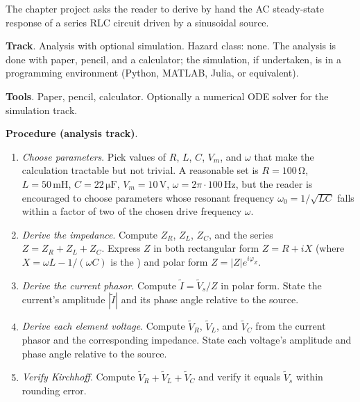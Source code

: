 \begin{project}
The chapter project
asks the reader to derive by hand the AC
steady-state response of a series RLC circuit driven by a
sinusoidal source.

\textbf{Track}. Analysis with optional simulation. Hazard class:
none. The analysis is done with paper, pencil, and a calculator;
the simulation, if undertaken, is in a programming environment
(Python, MATLAB, Julia, or equivalent).

\textbf{Tools}. Paper, pencil, calculator. Optionally a numerical
ODE solver for the simulation track.

\textbf{Procedure (analysis track)}.

\begin{enumerate}[leftmargin=*]
  \item \emph{Choose parameters}. Pick values of $R$, $L$, $C$,
    $V_{m}$, and $\omega$ that make the calculation tractable but
    not trivial. A reasonable set is $R = 100 \,\si{\ohm}$, $L =
    50 \,\si{\milli\henry}$, $C = 22 \,\si{\micro\farad}$,
    $V_{m} = 10 \,\si{\volt}$, $\omega = 2\pi \cdot 100 \,\si
    {\hertz}$, but the reader is encouraged to choose
    parameters whose resonant frequency $\omega_{0} = 1/\sqrt{LC}$
    falls within a factor of two of the chosen drive frequency
    $\omega$.

  \item \emph{Derive the impedance}. Compute $Z_{R}$, $Z_{L}$,
    $Z_{C}$, and the series $Z = Z_{R} + Z_{L} + Z_{C}$. Express
    $Z$ in both rectangular form $Z = R + iX$ (where $X = \omega
    L - 1/(\omega C)$ is the ) and polar form
    $Z = |Z| e^{i\varphi_{Z}}$.

  \item \emph{Derive the current phasor}. Compute $\tilde{I} =
    \tilde{V}_{s}/Z$ in polar form. State the current's amplitude
    $|\tilde{I}|$ and its phase angle relative to the source.

  \item \emph{Derive each element voltage}. Compute
    $\tilde{V}_{R}$, $\tilde{V}_{L}$, and $\tilde{V}_{C}$ from the
    current phasor and the corresponding impedance. State each
    voltage's amplitude and phase angle relative to the source.

  \item \emph{Verify Kirchhoff}. Compute $\tilde{V}_{R} +
    \tilde{V}_{L} + \tilde{V}_{C}$ and verify it equals
    $\tilde{V}_{s}$ within rounding error.


\end{enumerate}
\end{project}

